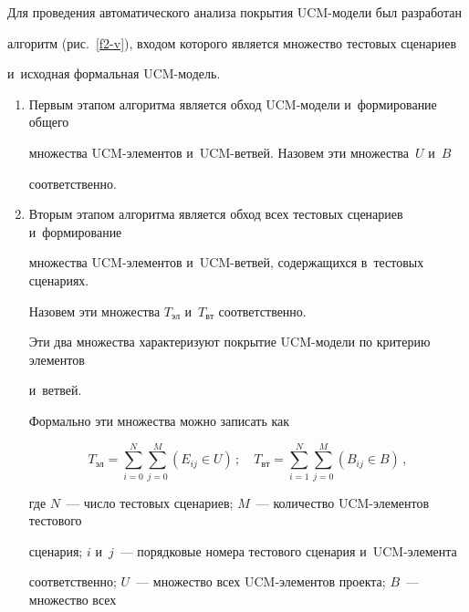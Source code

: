 \vspace*{-2pt}



  Для проведения автоматического анализа покрытия UCM-мо\-де\-ли был разработан

алгоритм (рис.~\ref{f2-v}), входом которого является множество тестовых сценариев

и~исходная формальная UCM-мо\-дель.

\begin{enumerate}[1.]

\item  Первым этапом алгоритма является обход UCM-мо\-де\-ли и~формирование общего

множества UCM-эле\-мен\-тов и~UCM-вет\-вей. Назовем эти множества~$U$ и~$B$

соответственно.

\item

  Вторым этапом алгоритма является обход всех тестовых сценариев и~формирование

множества UCM-эле\-мен\-тов и~UCM-вет\-вей, содержащихся в~тестовых сценариях.

Назовем эти множества $T_{\mathrm{эл}}$ и~$T_{\mathrm{вт}}$ соответственно.





  Эти два множества характеризуют покрытие UCM-мо\-де\-ли по критерию элементов

и~ветвей.



  Формально эти множества можно записать как

   \begin{equation*}

   T_{\mathrm{эл}} = \sum\limits_{i=0}^N \sum\limits_{j=0}^M (E_{ij}\in {U})\,;

   \quad

   T_{\mathrm{вт}} = \sum\limits_{i=1}^N \sum\limits_{j=0}^M (B_{ij}\in {B})\,,

   \end{equation*}

где $N$~--- число тестовых сценариев; $M$~--- количество UCM-эле\-мен\-тов тестового

сценария; $i$ и~$j$~--- порядковые номера тестового сценария и~UCM-эле\-мен\-та

соответственно; $U$~--- множество всех UCM-эле\-мен\-тов проекта; $B$~--- множество всех


\end{enumerate}
